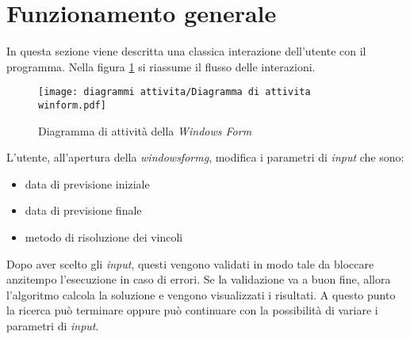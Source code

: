 \section{Funzionamento generale}
\noindent In questa sezione viene descritta una classica interazione dell'utente con il programma.
Nella figura \ref{diagramma-attivita-Windows form} si riassume il flusso delle interazioni.

\begin{figure}[!h] 
    \centering 
    \texttt{[image: diagrammi attivita/Diagramma di attivita winform.pdf]} 
    \caption{Diagramma di attività della \textit{Windows Form}}
    \label{diagramma-attivita-Windows form}
\end{figure}

\noindent L'utente, all'apertura della \textit{\gls{windowsformg}}, modifica i parametri di \textit{input} che sono:
\begin{itemize}
    \item data di previsione iniziale
    \item data di previsione finale
    \item metodo di risoluzione dei vincoli
\end{itemize}
\noindent Dopo aver scelto gli \textit{input}, questi vengono validati in modo tale da bloccare anzitempo
l'esecuzione in caso di errori.
Se la validazione va a buon fine, allora l'algoritmo calcola la soluzione e vengono visualizzati i risultati.
A questo punto la ricerca può terminare oppure può continuare con la possibilità di variare i parametri di \textit{input}.

